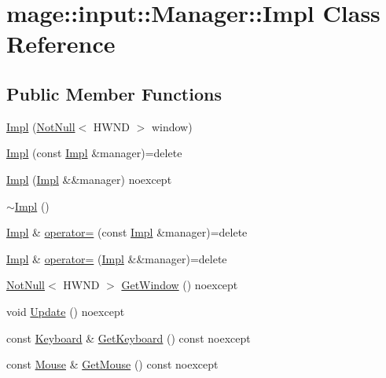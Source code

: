 \hypertarget{classmage_1_1input_1_1_manager_1_1_impl}{}\section{mage\+:\+:input\+:\+:Manager\+:\+:Impl Class Reference}
\label{classmage_1_1input_1_1_manager_1_1_impl}
\subsection*{Public Member Functions}
\begin{DoxyCompactItemize}
\item 
\hyperlink{classmage_1_1input_1_1_manager_1_1_impl_ac0bc834732b5870792d1b6557e9bbaf7}{Impl} (\hyperlink{namespacemage_a8769f9d670d6b585ea306cb1062af94b}{Not\+Null}$<$ H\+W\+ND $>$ window)
\item 
\hyperlink{classmage_1_1input_1_1_manager_1_1_impl_a9c1f7ee1af99eb2811820d622850dc06}{Impl} (const \hyperlink{classmage_1_1input_1_1_manager_1_1_impl}{Impl} \&manager)=delete
\item 
\hyperlink{classmage_1_1input_1_1_manager_1_1_impl_a15372813362704488fc264aa5d784b0e}{Impl} (\hyperlink{classmage_1_1input_1_1_manager_1_1_impl}{Impl} \&\&manager) noexcept
\item 
\hyperlink{classmage_1_1input_1_1_manager_1_1_impl_ac8699aba365e2b08ea6564f8b63b6ae0}{$\sim$\+Impl} ()
\item 
\hyperlink{classmage_1_1input_1_1_manager_1_1_impl}{Impl} \& \hyperlink{classmage_1_1input_1_1_manager_1_1_impl_a1b60284e1656b2a864bb29580c7a0107}{operator=} (const \hyperlink{classmage_1_1input_1_1_manager_1_1_impl}{Impl} \&manager)=delete
\item 
\hyperlink{classmage_1_1input_1_1_manager_1_1_impl}{Impl} \& \hyperlink{classmage_1_1input_1_1_manager_1_1_impl_a0dcf4b3269e6cd96b9c5864663c86322}{operator=} (\hyperlink{classmage_1_1input_1_1_manager_1_1_impl}{Impl} \&\&manager)=delete
\item 
\hyperlink{namespacemage_a8769f9d670d6b585ea306cb1062af94b}{Not\+Null}$<$ H\+W\+ND $>$ \hyperlink{classmage_1_1input_1_1_manager_1_1_impl_a79b6d5d2d8290f3b3a40a7ee522de2bf}{Get\+Window} () noexcept
\item 
void \hyperlink{classmage_1_1input_1_1_manager_1_1_impl_ac9e9b6d976dfdb2379664cf362c68600}{Update} () noexcept
\item 
const \hyperlink{classmage_1_1input_1_1_keyboard}{Keyboard} \& \hyperlink{classmage_1_1input_1_1_manager_1_1_impl_a7b43fbe5a7fd8697fea0e3c6b7d76186}{Get\+Keyboard} () const noexcept
\item 
const \hyperlink{classmage_1_1input_1_1_mouse}{Mouse} \& \hyperlink{classmage_1_1input_1_1_manager_1_1_impl_a0ed01275d65a2fe3998c95fef0e12a8b}{Get\+Mouse} () const noexcept
\end{DoxyCompactItemize}
